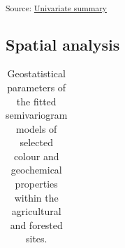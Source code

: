 \documentclass[
  number]{elsarticle}
\begin{document}
\textsubscript{Source:
\href{https://alex-koiter.github.io/spatial-variability-soil-manuscript/notebooks/univariate_summary.qmd.html\#cell-tbl-univariate2-summary}{Univariate
summary}}

\subsection{Spatial analysis}\label{spatial-analysis}

\begin{longtable}[]{@{}cccccccc@{}}

\caption{\label{tbl-geocol-semivariogram}Geostatistical parameters of
the fitted semivariogram models of selected colour and geochemical
properties within the agricultural and forested sites.}

\tabularnewline


\end{longtable}
\end{document}
